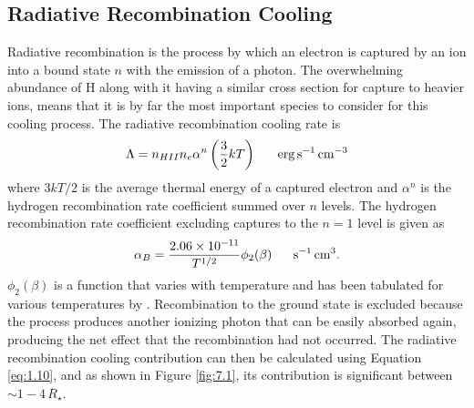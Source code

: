 \subsection{Radiative Recombination Cooling}\label{sec:7.3.2}
Radiative recombination is the process by which an electron is captured by an ion into a bound state $n$ with the emission of a photon. The overwhelming abundance of H along with it having a similar cross section for capture to heavier ions, means that it is by far the most important species to consider for this cooling process. The radiative recombination cooling rate is 
\begin{equation}
\Lambda = n_{HII}n_e  \alpha ^{n}\left(\frac{3}{2}kT\right) \ \ \ \ \ \rm{erg\,s^{-1}\,cm^{-3}}
\end{equation}
where $3kT/2$ is the average thermal energy of a captured electron and $\alpha ^{n}$ is the hydrogen recombination rate coefficient summed over $n$ levels. The hydrogen recombination rate coefficient excluding captures to the $n=1$ level is given as 
\begin{equation}
\alpha _{B}= \frac{2.06\times 10^{-11}}{T^{1/2}}\phi _{2}(\beta) \ \ \ \ \ \rm{s^{-1}\,cm^{3}}.
\end{equation}
$\phi _{2}(\beta)$ is a function that varies with temperature and has been tabulated for various temperatures by \citep{spitzer_1978}. Recombination to the ground state is excluded because the process produces another ionizing
photon that can be easily absorbed again, producing the net effect that the recombination had not occurred. The radiative recombination cooling contribution can then be calculated using Equation \ref{eq:1.10}, and as shown in Figure \ref{fig:7.1}, its contribution is significant between $\sim 1-4\,R_{\star}$. 


